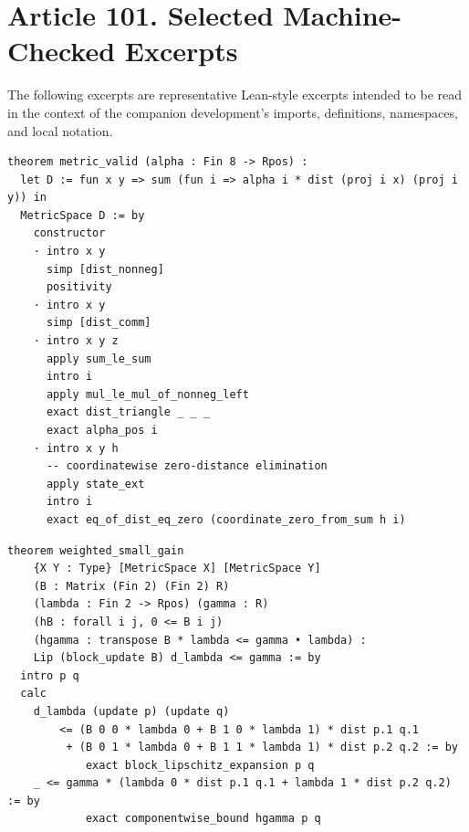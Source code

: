 \documentclass[10pt,oneside]{article}
\theoremstyle{definition}
\theoremstyle{remark}
\begin{document}
\section{Article 101. Selected Machine-Checked Excerpts}
The following excerpts are representative Lean-style excerpts intended to be read in the context of the companion development's imports, definitions, namespaces, and local notation.

\begin{lstlisting}[language={},caption={Metric validity proof shape.}]
theorem metric_valid (alpha : Fin 8 -> Rpos) :
  let D := fun x y => sum (fun i => alpha i * dist (proj i x) (proj i y)) in
  MetricSpace D := by
    constructor
    · intro x y
      simp [dist_nonneg]
      positivity
    · intro x y
      simp [dist_comm]
    · intro x y z
      apply sum_le_sum
      intro i
      apply mul_le_mul_of_nonneg_left
      exact dist_triangle _ _ _
      exact alpha_pos i
    · intro x y h
      -- coordinatewise zero-distance elimination
      apply state_ext
      intro i
      exact eq_of_dist_eq_zero (coordinate_zero_from_sum h i)
\end{lstlisting}

\begin{lstlisting}[language={},caption={Weighted small-gain proof shape.}]
theorem weighted_small_gain
    {X Y : Type} [MetricSpace X] [MetricSpace Y]
    (B : Matrix (Fin 2) (Fin 2) R)
    (lambda : Fin 2 -> Rpos) (gamma : R)
    (hB : forall i j, 0 <= B i j)
    (hgamma : transpose B * lambda <= gamma • lambda) :
    Lip (block_update B) d_lambda <= gamma := by
  intro p q
  calc
    d_lambda (update p) (update q)
        <= (B 0 0 * lambda 0 + B 1 0 * lambda 1) * dist p.1 q.1
         + (B 0 1 * lambda 0 + B 1 1 * lambda 1) * dist p.2 q.2 := by
            exact block_lipschitz_expansion p q
    _ <= gamma * (lambda 0 * dist p.1 q.1 + lambda 1 * dist p.2 q.2) := by
            exact componentwise_bound hgamma p q
\end{lstlisting}
\end{document}

